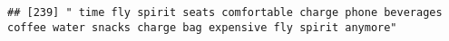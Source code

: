\documentclass[
]{article}
\begin{document}
\begin{verbatim}
## [239] " time fly spirit seats comfortable charge phone beverages coffee water snacks charge bag expensive fly spirit anymore"                                                                                                                                                                                                                                                                                                                                                                                                                                                                                                                                                                                                                                                                                                                                                                                                                                                                                                                                                                                                                                                                                                                                                                                                                                                                                                                                                                                                                                                                                                                                                                                                                                                                         

\end{verbatim}
\end{document}
